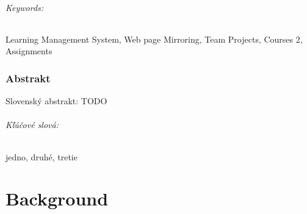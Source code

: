 \documentclass[12pt, oneside]{book}
\begin{document}
\paragraph*{Keywords:} Learning Management System, Web page Mirroring, Team Projects, Courses 2, Assignments


\newpage 
\section*{Abstrakt}


Slovenský abstrakt: TODO

\paragraph*{Kľúčové slová:} jedno, druhé, tretie

%
%



\newpage 

\tableofcontents
\lstlistoflistings
\listoffigures



\newpage 



\mainmatter


 

\part{Background}




\end{document}
